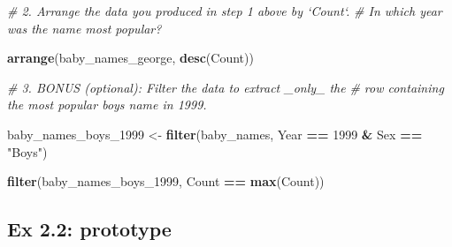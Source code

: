 \documentclass[]{book}
\newenvironment{Shaded}{\begin{snugshade}}{\end{snugshade}}
\newcommand{\KeywordTok}[1]{\textcolor[rgb]{0.13,0.29,0.53}{\textbf{#1}}}
\newcommand{\DecValTok}[1]{\textcolor[rgb]{0.00,0.00,0.81}{#1}}
\newcommand{\StringTok}[1]{\textcolor[rgb]{0.31,0.60,0.02}{#1}}
\newcommand{\CommentTok}[1]{\textcolor[rgb]{0.56,0.35,0.01}{\textit{#1}}}
\newcommand{\OperatorTok}[1]{\textcolor[rgb]{0.81,0.36,0.00}{\textbf{#1}}}
\newcommand{\NormalTok}[1]{#1}
\begin{document}
\begin{Shaded}
\begin{Highlighting}[]
\CommentTok{# 2.  Arrange the data you produced in step 1 above by `Count`. }
\CommentTok{#     In which year was the name most popular?}
\end{Highlighting}
\end{Shaded}

\begin{Shaded}
\begin{Highlighting}[]
\KeywordTok{arrange}\NormalTok{(baby_names_george, }\KeywordTok{desc}\NormalTok{(Count))}
\end{Highlighting}
\end{Shaded}

\begin{Shaded}
\begin{Highlighting}[]
\CommentTok{# 3.  BONUS (optional): Filter the data to extract _only_ the }
\CommentTok{#     row containing the most popular boys name in 1999.}
\end{Highlighting}
\end{Shaded}

\begin{Shaded}
\begin{Highlighting}[]
\NormalTok{baby_names_boys_}\DecValTok{1999}\NormalTok{ <-}\StringTok{ }\KeywordTok{filter}\NormalTok{(baby_names, }
\NormalTok{                    Year }\OperatorTok{==}\StringTok{ }\DecValTok{1999} \OperatorTok{&}\StringTok{ }\NormalTok{Sex }\OperatorTok{==}\StringTok{ "Boys"}\NormalTok{)}
\end{Highlighting}
\end{Shaded}

\begin{Shaded}
\begin{Highlighting}[]
\KeywordTok{filter}\NormalTok{(baby_names_boys_}\DecValTok{1999}\NormalTok{, Count }\OperatorTok{==}\StringTok{ }\KeywordTok{max}\NormalTok{(Count))}
\end{Highlighting}
\end{Shaded}

\subsection{Ex 2.2: prototype}\label{ex-2.2-prototype}

\begin{Shaded}
\end{Shaded}
\end{document}
